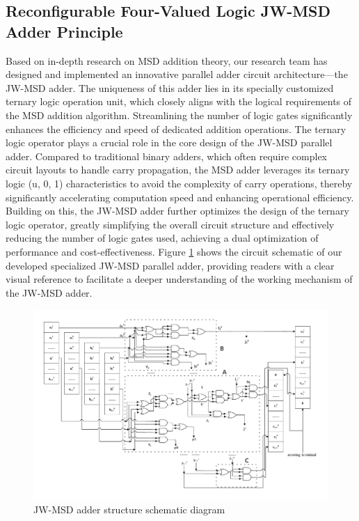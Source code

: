 \documentclass[electronics,article,accept,pdftex,moreauthors]{Definitions/mdpi}
\begin{document}
\subsection{Reconfigurable Four-Valued Logic JW-MSD Adder Principle}
Based on in-depth research on MSD  addition theory, our research team has designed and implemented an innovative parallel adder circuit architecture—the JW-MSD adder. The uniqueness of this adder lies in its specially customized ternary logic operation unit, which closely aligns with the logical requirements of the MSD addition algorithm. Streamlining the number of logic gates significantly enhances the efficiency and speed of dedicated addition operations. The ternary logic operator plays a crucial role in the core design of the JW-MSD parallel adder. Compared to traditional binary adders, which often require complex circuit layouts to handle carry propagation, the MSD adder leverages its ternary logic (u, 0, 1) characteristics to avoid the complexity of carry operations, thereby significantly accelerating computation speed and enhancing operational efficiency. Building on this, the JW-MSD adder further optimizes the design of the ternary logic operator, greatly simplifying the overall circuit structure and effectively reducing the number of logic gates used, achieving a dual optimization of performance and cost-effectiveness. Figure \ref{fig3} shows the circuit schematic of our developed specialized JW-MSD parallel adder, providing readers with a clear visual reference to facilitate a deeper understanding of the working mechanism of the JW-MSD adder.
\begin{figure}[H]
    \includegraphics[scale=0.45]{./images/3.pdf}
    \caption{JW-MSD adder structure schematic diagram}
    \label{fig3}
\end{figure}
\end{document}
